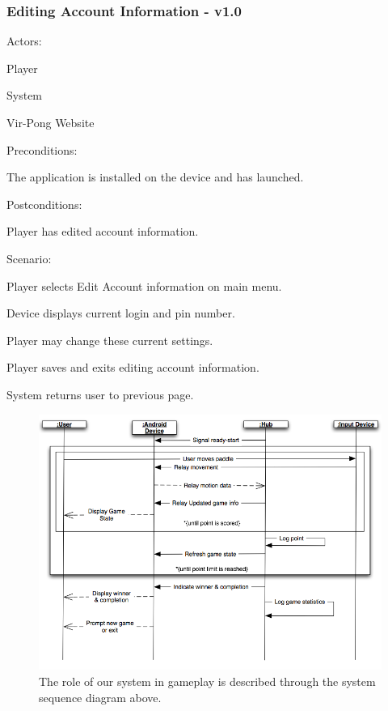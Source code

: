 \documentclass[12pt]{article}
\newenvironment{itemize*}%
  {\begin{itemize}%
  	\setlength{\parsep}{0pt}
    \setlength{\itemsep}{0pt}%
    \setlength{\parskip}{0pt}}%
  {\end{itemize}}
\newenvironment{enumerate*}%
  {\begin{enumerate}%
  	\setlength{\parsep}{0pt}
    \setlength{\itemsep}{0pt}%
    \setlength{\parskip}{0pt}}%
  {\end{enumerate}}
\begin{document}
\subsubsection*{Editing Account Information - v1.0}
Actors:
\begin{itemize*}
\item Player
\item System
\item Vir-Pong Website
\end{itemize*}
Preconditions:
\begin{itemize*}
\item The application is installed on the device and has launched.
\end{itemize*}
Postconditions:
\begin{itemize*}
\item Player has edited account information.
\end{itemize*}
Scenario:
\begin{enumerate*}
\item Player selects Edit Account information on main menu.
\item Device displays current login and pin number.
\item Player may change these current settings.
\item Player saves and exits editing account information.
\item System returns user to previous page.
\end{enumerate*} 

\onehalfspacing




\begin{figure}
\begin{center}
\includegraphics[scale=.5]{ssd_GamePlay_1.png}
\caption{\label{ssd_GamePlay_1}The role of our system in gameplay is described through the system sequence diagram above.}
\end{center}
\end{figure}
\end{document}
